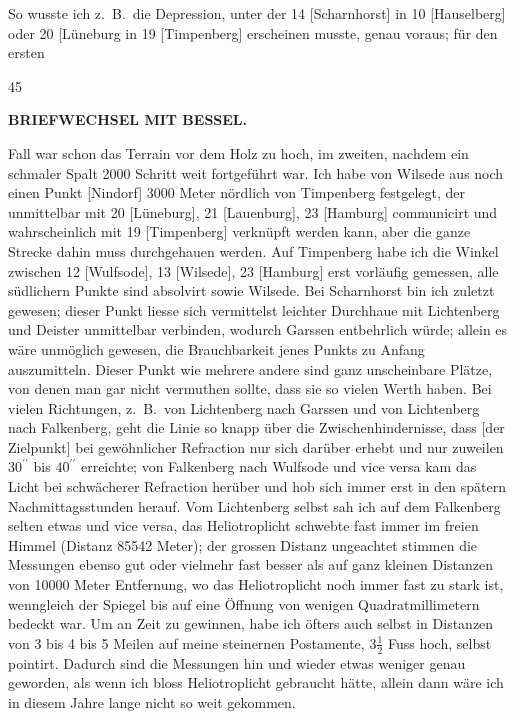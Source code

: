 So wusste ich z.~B.\ die Depression, unter der 14 [Scharnhorst] in 10 [Hauselberg] oder 20 [Lüneburg in 19 [Timpenberg] erscheinen musste, genau voraus; für den ersten
\par\smallskip{}\hfill{\footnotesize45}\par
\clearpage
{}\hfill{\small\textbf{BRIEFWECHSEL MIT BESSEL.}}\par\medskip
\noindent Fall war schon das Terrain vor dem Holz zu hoch, im zweiten, nachdem ein schmaler Spalt 2000 Schritt weit fortgeführt war.
Ich habe von Wilsede aus noch einen Punkt [Nindorf] 3000 Meter nördlich von Timpenberg festgelegt, der unmittelbar mit 20 [Lüneburg], 21 [Lauenburg], 23 [Hamburg] communicirt und wahrscheinlich mit 19 [Timpenberg] verknüpft werden kann, aber die ganze Strecke dahin muss durchgehauen werden.
Auf Timpenberg habe ich die Winkel zwischen 12 [Wulfsode], 13 [Wilsede], 23 [Hamburg] erst vorläufig gemessen, alle südlichern Punkte sind absolvirt sowie Wilsede.
Bei Scharnhorst bin ich zuletzt gewesen; dieser Punkt liesse sich vermittelst leichter Durchhaue mit Lichtenberg und Deister unmittelbar verbinden, wodurch Garssen entbehrlich würde; allein es wäre unmöglich gewesen, die Brauchbarkeit jenes Punkts zu Anfang auszumitteln.
Dieser Punkt wie mehrere andere sind ganz unscheinbare Plätze, von denen man gar nicht vermuthen sollte, dass sie so vielen Werth haben.
Bei vielen Richtungen, z.~B.\ von Lichtenberg nach Garssen und von Lichtenberg nach Falkenberg, geht die Linie so knapp über die Zwischenhindernisse, dass [der Zielpunkt] bei gewöhnlicher Refraction nur  sich darüber erhebt und nur zuweilen \(30^{\prime\prime}\) bis \(40^{\prime\prime}\) erreichte; von Falkenberg nach Wulfsode und vice versa kam das Licht bei schwächerer Refraction  herüber und hob sich immer erst in den spätern Nachmittagsstunden herauf.
Vom Lichtenberg selbst sah ich auf dem Falkenberg selten etwas und vice versa, das Heliotroplicht schwebte fast immer im freien Himmel (Distanz 85542 Meter); der grossen Distanz ungeachtet stimmen die Messungen ebenso gut oder vielmehr fast besser als auf ganz kleinen Distanzen von 10000 Meter Entfernung, wo das Heliotroplicht noch immer fast zu stark ist, wenngleich der Spiegel bis auf eine Öffnung von wenigen Quadratmillimetern bedeckt war.
Um an Zeit zu gewinnen, habe ich öfters auch selbst in Distanzen von 3 bis 4 bis 5 Meilen auf meine steinernen Postamente, \(3\frac{1}{2}\) Fuss hoch, selbst pointirt.
Dadurch sind die Messungen hin und wieder etwas weniger genau geworden, als wenn ich bloss Heliotroplicht gebraucht hätte, allein dann wäre ich in diesem Jahre lange nicht so weit gekommen.
